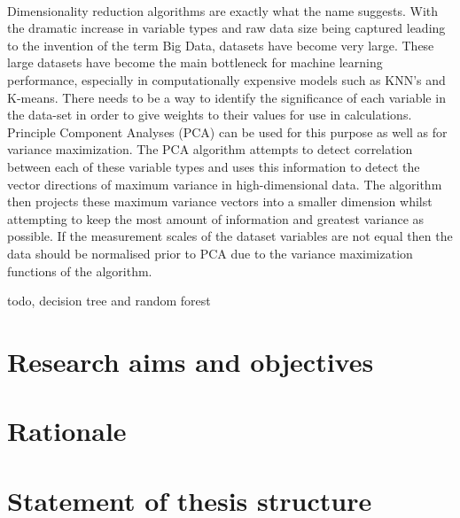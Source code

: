 \paragraph{}Dimensionality reduction algorithms are exactly what the name suggests. With the dramatic increase in variable types and raw data size being captured leading to the invention of the term Big Data, datasets have become very large. These large datasets have become the main bottleneck for machine learning performance, especially in computationally expensive models such as KNN’s and K-means. There needs to be a way to identify the significance of each variable in the data-set in order to give weights to their values for use in calculations. Principle Component Analyses (PCA) can be used for this purpose as well as for variance maximization. The PCA algorithm attempts to detect correlation between each of these variable types and uses this information to detect the vector directions of maximum variance in high-dimensional data. The algorithm then projects these maximum variance vectors into a smaller dimension whilst attempting to keep the most amount of information and greatest variance as possible. If the measurement scales of the dataset variables are not equal then the data should be normalised prior to PCA due to the variance maximization functions of the algorithm.

todo, decision tree and random forest
\section{Research aims and objectives}
\label{sec:section7}

\section{Rationale}
\label{sec:section8}

\section{Statement of thesis structure}
\label{sec:section9}


